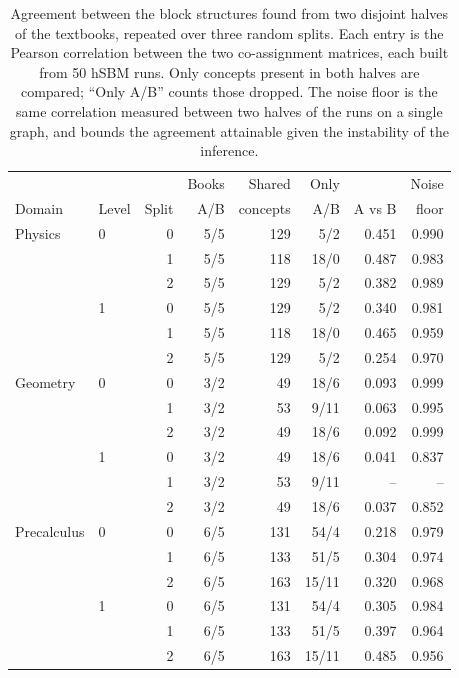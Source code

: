 \begin{table}[t]
  \centering
  \caption{Agreement between the block structures found from two disjoint halves of the textbooks, repeated over three random splits. Each entry is the Pearson correlation between the two co-assignment matrices, each built from 50 hSBM runs. Only concepts present in both halves are compared; ``Only A/B'' counts those dropped. The noise floor is the same correlation measured between two halves of the runs on a single graph, and bounds the agreement attainable given the instability of the inference.}
  \label{tab:splits}
  \begin{tabular}{llrrrrrr}
    \toprule
    & & & Books & Shared & Only & & Noise \\
    Domain & Level & Split & A/B & concepts & A/B & A vs B & floor \\
    \midrule
  Physics & 0 & 0 & 5/5 & 129 & 5/2 & 0.451 & 0.990 \\
   &  & 1 & 5/5 & 118 & 18/0 & 0.487 & 0.983 \\
   &  & 2 & 5/5 & 129 & 5/2 & 0.382 & 0.989 \\
  \addlinespace[2pt]
   & 1 & 0 & 5/5 & 129 & 5/2 & 0.340 & 0.981 \\
   &  & 1 & 5/5 & 118 & 18/0 & 0.465 & 0.959 \\
   &  & 2 & 5/5 & 129 & 5/2 & 0.254 & 0.970 \\
  \addlinespace[2pt]
  Geometry & 0 & 0 & 3/2 & 49 & 18/6 & 0.093 & 0.999 \\
   &  & 1 & 3/2 & 53 & 9/11 & 0.063 & 0.995 \\
   &  & 2 & 3/2 & 49 & 18/6 & 0.092 & 0.999 \\
  \addlinespace[2pt]
   & 1 & 0 & 3/2 & 49 & 18/6 & 0.041 & 0.837 \\
   &  & 1 & 3/2 & 53 & 9/11 & -- & -- \\
   &  & 2 & 3/2 & 49 & 18/6 & 0.037 & 0.852 \\
  \addlinespace[2pt]
  Precalculus & 0 & 0 & 6/5 & 131 & 54/4 & 0.218 & 0.979 \\
   &  & 1 & 6/5 & 133 & 51/5 & 0.304 & 0.974 \\
   &  & 2 & 6/5 & 163 & 15/11 & 0.320 & 0.968 \\
  \addlinespace[2pt]
   & 1 & 0 & 6/5 & 131 & 54/4 & 0.305 & 0.984 \\
   &  & 1 & 6/5 & 133 & 51/5 & 0.397 & 0.964 \\
   &  & 2 & 6/5 & 163 & 15/11 & 0.485 & 0.956 \\
    \bottomrule
  \end{tabular}
\end{table}
